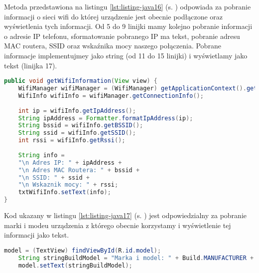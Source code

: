 Metoda przedstawiona na listingu \ref{lst:listing-java16} (s. \pageref{lst:listing-java16}) odpowiada za pobranie informacji o sieci wifi do której urządzenie jest obecnie podłączone oraz wyświetlenia tych informacji. Od 5 do 9 linijki mamy kolejno pobranie informacji o adresie IP telefonu, sformatowanie pobranego IP ma tekst, pobranie adresu MAC routera, SSID oraz wskaźnika mocy naszego połączenia. Pobrane informacje implementujmey jako string (od 11 do 15 linijki) i wyświetlamy jako tekst (linijka 17).
\begin{lstlisting}[caption=Wifi - Pobieranie informacji o Wifi, label={lst:listing-java16}, language=Java]
    public void getWifiInformation(View view) {
	WifiManager wifiManager = (WifiManager) getApplicationContext().getSystemService(WIFI_SERVICE);
	WifiInfo wifiInfo = wifiManager.getConnectionInfo();
	
	int ip = wifiInfo.getIpAddress();
	String ipAddress = Formatter.formatIpAddress(ip);
	String bssid = wifiInfo.getBSSID();
	String ssid = wifiInfo.getSSID();
	int rssi = wifiInfo.getRssi();
		
	String info =
	"\n Adres IP: " + ipAddress +
	"\n Adres MAC Routera: " + bssid +
	"\n SSID: " + ssid +
	"\n Wskaznik mocy: " + rssi;
	txtWifiInfo.setText(info);	
}
\end{lstlisting}


Kod ukazany w listingu \ref{lst:listing-java17} (s. \pageref{lst:listing-java17}) jest odpowiedzialny za pobranie marki i modeu urządzenia z którego obecnie korzystamy i wyświetlenie tej informacji jako tekst.
\begin{lstlisting}[caption=Wyniki - Pobranie marki i modelu urządzenia, label={lst:listing-java17}, language=Java]
	model = (TextView) findViewById(R.id.model);
	String stringBuildModel = "Marka i model: " + Build.MANUFACTURER + " " + Build.MODEL;
	model.setText(stringBuildModel);
\end{lstlisting}


